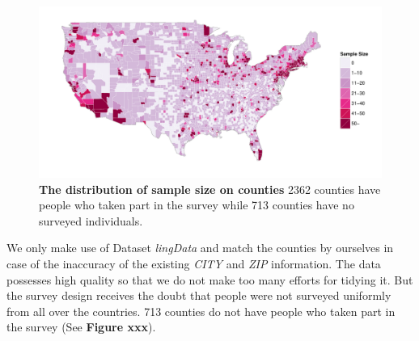 \begin{figure}[t!]
    \centering
    \includegraphics[width=1\textwidth]{fig/Map_size.pdf}   
    \caption{\textbf{The distribution of sample size on counties} 2362 counties have people who taken part in the survey while 713 counties have no surveyed individuals.} 
\end{figure}

\qquad We only make use of Dataset \textit{lingData} and match the counties by ourselves in case of the inaccuracy of the existing \textit{CITY} and \textit{ZIP} information. The data possesses high quality so that we do not make too many efforts for tidying it. But the survey design receives the doubt that people were not surveyed uniformly from all over the countries. 713 counties do not have people who taken part in the survey (See \textbf{Figure xxx}).

